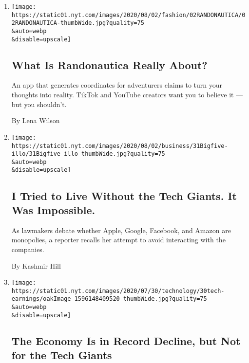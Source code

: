 \begin{enumerate}
\def\labelenumi{\arabic{enumi}.}
\item
  \href{/2020/07/31/style/randonautica-app.html}{}

  \texttt{[image: https://static01.nyt.com/images/2020/08/02/fashion/02RANDONAUTICA/02RANDONAUTICA-thumbWide.jpg?quality=75\\\&auto=webp\\\&disable=upscale]}

  \hypertarget{what-is-randonautica-really-about}{%
  \subsection{What Is Randonautica Really
  About?}\label{what-is-randonautica-really-about}}

  An app that generates coordinates for adventurers claims to turn your
  thoughts into reality. TikTok and YouTube creators want you to believe
  it --- but you shouldn't.

  By Lena Wilson
\item
  \href{/2020/07/31/technology/blocking-the-tech-giants.html}{}

  \texttt{[image: https://static01.nyt.com/images/2020/08/02/business/31Bigfive-illo/31Bigfive-illo-thumbWide.jpg?quality=75\\\&auto=webp\\\&disable=upscale]}

  \hypertarget{i-tried-to-live-without-the-tech-giants-it-was-impossible}{%
  \subsection{I Tried to Live Without the Tech Giants. It Was
  Impossible.}\label{i-tried-to-live-without-the-tech-giants-it-was-impossible}}

  As lawmakers debate whether Apple, Google, Facebook, and Amazon are
  monopolies, a reporter recalls her attempt to avoid interacting with
  the companies.

  By Kashmir Hill
\item
  \href{/2020/07/30/technology/tech-company-earnings-amazon-apple-facebook-google.html}{}

  \texttt{[image: https://static01.nyt.com/images/2020/07/30/technology/30tech-earnings/oakImage-1596148409520-thumbWide.jpg?quality=75\\\&auto=webp\\\&disable=upscale]}

  \hypertarget{the-economy-is-in-record-decline-but-not-for-the-tech-giants}{%
  \subsection{The Economy Is in Record Decline, but Not for the Tech
  Giants}\label{the-economy-is-in-record-decline-but-not-for-the-tech-giants}}


\end{enumerate}
